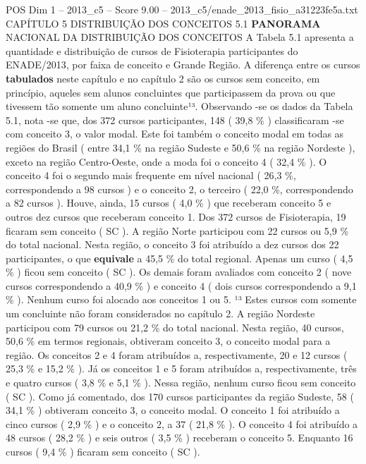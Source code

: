 \begin{textsample}{POS Dim 1 – 2013\_c5 – Score 9.00 – 2013\_c5/enade\_2013\_fisio\_a31223fe5a.txt}  \label{ex:f1_pos_086}
CAPÍTULO 5 DISTRIBUIÇÃO DOS CONCEITOS 5.1 \textbf{PANORAMA} NACIONAL DA DISTRIBUIÇÃO DOS CONCEITOS A Tabela 5.1 apresenta a quantidade e distribuição de cursos de Fisioterapia participantes do ENADE/2013, por faixa de conceito e Grande Região.
A diferença entre os cursos \textbf{tabulados} neste capítulo e no capítulo 2 são os cursos sem conceito, em princípio, aqueles sem alunos concluintes que participassem da prova ou que tivessem tão somente um aluno concluinte¹³.
Observando -se os dados da Tabela 5.1, nota -se que, dos 372 cursos participantes, 148 ( 39,8 \% ) classificaram -se com conceito 3, o valor modal.
Este foi também o conceito modal em todas as regiões do Brasil ( entre 34,1 \% na região Sudeste e 50,6 \% na região Nordeste ), exceto na região Centro-Oeste, onde a moda foi o conceito 4 ( 32,4 \% ).
O conceito 4 foi o segundo mais frequente em nível nacional ( 26,3 \%, correspondendo a 98 cursos ) e o conceito 2, o terceiro ( 22,0 \%, correspondendo a 82 cursos ).
Houve, ainda, 15 cursos ( 4,0 \% ) que receberam conceito 5 e outros dez cursos que receberam conceito 1.
Dos 372 cursos de Fisioterapia, 19 ficaram sem conceito ( SC ).
A região Norte participou com 22 cursos ou 5,9 \% do total nacional.
Nesta região, o conceito 3 foi atribuído a dez cursos dos 22 participantes, o que \textbf{equivale} a 45,5 \% do total regional.
Apenas um curso ( 4,5 \% ) ficou sem conceito ( SC ).
Os demais foram avaliados com conceito 2 ( nove cursos correspondendo a 40,9 \% ) e conceito 4 ( dois cursos correspondendo a 9,1 \% ).
Nenhum curso foi alocado aos conceitos 1 ou 5. ¹³ Estes cursos com somente um concluinte não foram considerados no capítulo 2.
A região Nordeste participou com 79 cursos ou 21,2 \% do total nacional.
Nesta região, 40 cursos, 50,6 \% em termos regionais, obtiveram conceito 3, o conceito modal para a região.
Os conceitos 2 e 4 foram atribuídos a, respectivamente, 20 e 12 cursos ( 25,3 \% e 15,2 \% ).
Já os conceitos 1 e 5 foram atribuídos a, respectivamente, três e quatro cursos ( 3,8 \% e 5,1 \% ).
Nessa região, nenhum curso ficou sem conceito ( SC ).
Como já comentado, dos 170 cursos participantes da região Sudeste, 58 ( 34,1 \% ) obtiveram conceito 3, o conceito modal.
O conceito 1 foi atribuído a cinco cursos ( 2,9 \% ) e o conceito 2, a 37 ( 21,8 \% ).
O conceito 4 foi atribuído a 48 cursos ( 28,2 \% ) e seis outros ( 3,5 \% ) receberam o conceito 5.
Enquanto 16 cursos ( 9,4 \% ) ficaram sem conceito ( SC ).

\end{textsample}
